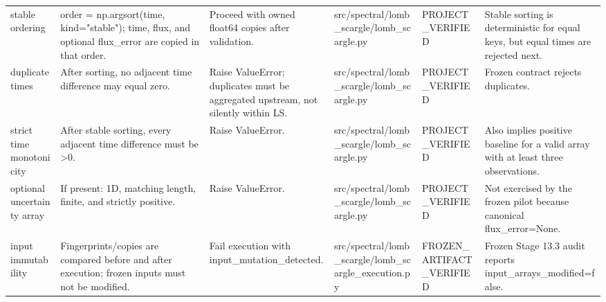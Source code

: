 \begin{longtable}{llllll}
stable ordering & order = np.argsort(time, kind="stable"); time, flux, and optional flux\_error are copied in that order. & Proceed with owned float64 copies after validation. & src/spectral/lomb\_scargle/lomb\_scargle.py & PROJECT\_VERIFIED & Stable sorting is deterministic for equal keys, but equal times are rejected next. \\
duplicate times & After sorting, no adjacent time difference may equal zero. & Raise ValueError; duplicates must be aggregated upstream, not silently within LS. & src/spectral/lomb\_scargle/lomb\_scargle.py & PROJECT\_VERIFIED & Frozen contract rejects duplicates. \\
strict time monotonicity & After stable sorting, every adjacent time difference must be >0. & Raise ValueError. & src/spectral/lomb\_scargle/lomb\_scargle.py & PROJECT\_VERIFIED & Also implies positive baseline for a valid array with at least three observations. \\
optional uncertainty array & If present: 1D, matching length, finite, and strictly positive. & Raise ValueError. & src/spectral/lomb\_scargle/lomb\_scargle.py & PROJECT\_VERIFIED & Not exercised by the frozen pilot because canonical flux\_error=None. \\
input immutability & Fingerprints/copies are compared before and after execution; frozen inputs must not be modified. & Fail execution with input\_mutation\_detected. & src/spectral/lomb\_scargle/lomb\_scargle\_execution.py & FROZEN\_ARTIFACT\_VERIFIED & Frozen Stage 13.3 audit reports input\_arrays\_modified=false. \\
\bottomrule
\end{longtable}
